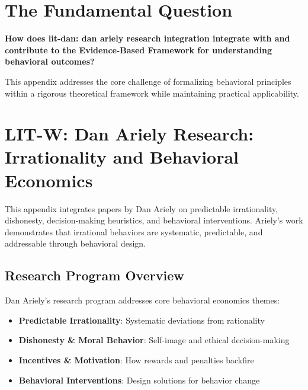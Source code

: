 \section{The Fundamental Question}
\label{sec:ari-fundamental}

\begin{tcolorbox}[
    colback=red!5!white,
    colframe=red!75!black,
    title={\textbf{Fundamental Question}}
]
\textbf{How does lit-dan: dan ariely research integration integrate with and contribute to the
Evidence-Based Framework for understanding behavioral outcomes?}

This appendix addresses the core challenge of formalizing behavioral principles
within a rigorous theoretical framework while maintaining practical applicability.
\end{tcolorbox}




\section{LIT-W: Dan Ariely Research: Irrationality and Behavioral Economics}
\label{app:litw}

This appendix integrates papers by Dan Ariely on predictable irrationality,
dishonesty, decision-making heuristics, and behavioral interventions. Ariely's work demonstrates
that irrational behaviors are systematic, predictable, and addressable through behavioral design.

\subsection{Research Program Overview}

Dan Ariely's research program addresses core behavioral economics themes:

\begin{itemize}
  \item \textbf{Predictable Irrationality}: Systematic deviations from rationality
  \item \textbf{Dishonesty & Moral Behavior}: Self-image and ethical decision-making
  \item \textbf{Incentives & Motivation}: How rewards and penalties backfire
  \item \textbf{Behavioral Interventions}: Design solutions for behavior change
\end{itemize}

